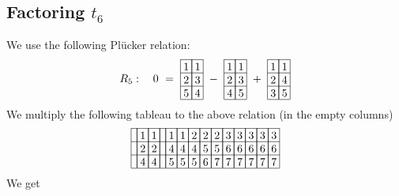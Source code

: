 \subsection{Factoring \(t_6\)}
We use the following Pl\"{u}cker relation:
\begin{align*}
R_5:\ \ \ 0\ =\ 
\begin{array}[c]{*{2}c}\cline{1-2}
\lr{1}&\lr{1}\\\cline{1-2}
\lr{2}&\lr{3}\\\cline{1-2}
\lr{5}&\lr{4}\\\cline{1-2}
\end{array}
\ -\ 
\begin{array}[c]{*{2}c}\cline{1-2}
\lr{1}&\lr{1}\\\cline{1-2}
\lr{2}&\lr{3}\\\cline{1-2}
\lr{4}&\lr{5}\\\cline{1-2}
\end{array}
\ +\ 
\begin{array}[c]{*{2}c}\cline{1-2}
\lr{1}&\lr{1}\\\cline{1-2}
\lr{2}&\lr{4}\\\cline{1-2}
\lr{3}&\lr{5}\\\cline{1-2}
\end{array}
\end{align*}
We multiply the following tableau to the above relation (in the empty columns)
\[
\begin{array}[b]{*{14}c}\cline{1-14}
\lr{}&\lr{1}&\lr{1}&\lr{}&\lr{1}&\lr{1}&\lr{2}&\lr{2}&\lr{2}&\lr{3}&\lr{3}&\lr{3}&\lr{3}&\lr{3}\\\cline{1-14}
\lr{}&\lr{2}&\lr{2}&\lr{}&\lr{4}&\lr{4}&\lr{4}&\lr{5}&\lr{5}&\lr{6}&\lr{6}&\lr{6}&\lr{6}&\lr{6}\\\cline{1-14}
\lr{}&\lr{4}&\lr{4}&\lr{}&\lr{5}&\lr{5}&\lr{5}&\lr{6}&\lr{7}&\lr{7}&\lr{7}&\lr{7}&\lr{7}&\lr{7}\\\cline{1-14}
\end{array}    
\]
We get
